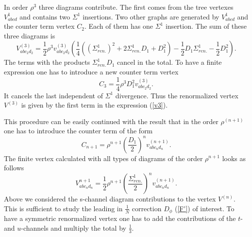\documentclass[a4paper,12pt]{article}
\begin{document}
In order $\rho^3$ three diagrams contribute. The first comes from the
tree vertexes $V^1_{abcd}$ and contains two $\Sigma^1$ insertions.
Two other graphs are generated by $V^1_{abcd}$ and the counter term
vertex $C_2$. Each of them has one $\Sigma^1$ insertion. The sum of
these three diagrams is
\begin{equation} \label{v3}
V^{(3)}_{abc_2 d_2} = \frac{1}{2} \rho^3 v^{(3)}_{abc_2 d_2}(
\frac{1}{4}( (\Sigma^1_{ren.})^2 + 2 \Sigma^1_{ren.}  D_1 + D_1^2 ) -
\frac{1}{2} D_1 \Sigma^1_{ren.} - \frac{1}{2} D_1^2 ).
\end{equation}
The terms with the products $\Sigma^1_{ren.}  D_1$ cancel in the
total. To have a finite expression one has to introduce a new counter
term vertex
\begin{equation} \label{c3}
C_3 = \frac{1}{4} \rho^3 D_1^2 v^{(3)}_{abc_2 d_2}.
\end{equation}
It cancels the last independent of $\Sigma^1$ divergence.  Thus the
renormalized vertex $V^{(3)}$ is given by the first term in the
expression (\ref{v3}).

This procedure can be easily continued with the result that in the
order $\rho^{(n+1)}$ one has to introduce the counter term of the
form
\begin{equation} \label{cn}
C_{n+1} = \rho^{n+1} (\frac{  D_1}{2})^n v^{(n+1)}_{abc_n d_n}.
\end{equation}
The finite vertex calculated with  all types of diagrams of the order
$\rho^{n+1}$ looks as follows
\begin{equation} \label{vn}
V^{n+1}_{abc_n d_n} = \frac{1}{2}\rho^{n+1} (\frac{
\Sigma^1_{ren.}}{2})^n v^{(n+1)}_{abc_n d_n}.
\end{equation}
Above  we considered the s-channel diagram contributions to the
vertex $V^{(n)}$. This is sufficient to study the leading in
$\frac{1}{N}$ correction $D_{\phi}$ (\ref{F'}) of interest. To have a
symmetric renormalized vertex one has to add the contributions of the
$t$- and $u$-channels and multiply the total by $\frac{1}{3}$.
\end{document}
